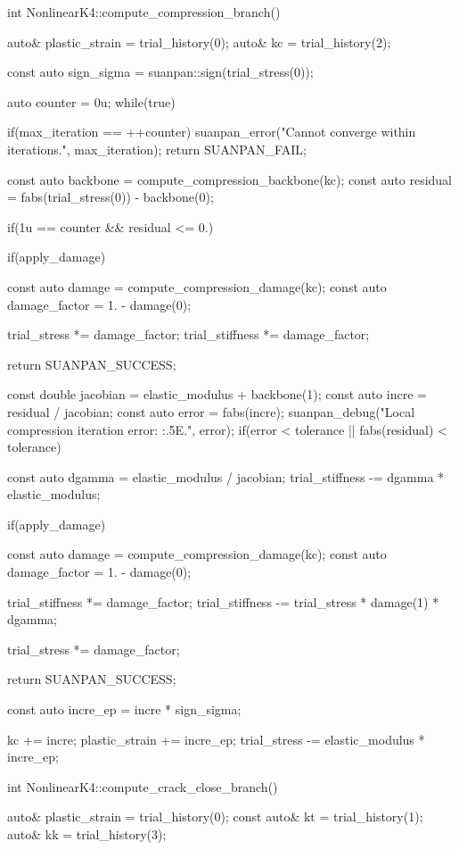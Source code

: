 \begin{cppcode}
int NonlinearK4::compute_compression_branch() {
    auto& plastic_strain = trial_history(0);
    auto& kc = trial_history(2);

    const auto sign_sigma = suanpan::sign(trial_stress(0));

    auto counter = 0u;
    while(true) {
        if(max_iteration == ++counter) {
            suanpan_error("Cannot converge within {} iterations.\n", max_iteration);
            return SUANPAN_FAIL;
        }

        const auto backbone = compute_compression_backbone(kc);
        const auto residual = fabs(trial_stress(0)) - backbone(0);

        if(1u == counter && residual <= 0.) {
            if(apply_damage) {
                const auto damage = compute_compression_damage(kc);
                const auto damage_factor = 1. - damage(0);

                trial_stress *= damage_factor;
                trial_stiffness *= damage_factor;
            }

            return SUANPAN_SUCCESS;
        }

        const double jacobian = elastic_modulus + backbone(1);
        const auto incre = residual / jacobian;
        const auto error = fabs(incre);
        suanpan_debug("Local compression iteration error: {:.5E}.\n", error);
        if(error < tolerance || fabs(residual) < tolerance) {
            const auto dgamma = elastic_modulus / jacobian;
            trial_stiffness -= dgamma * elastic_modulus;

            if(apply_damage) {
                const auto damage = compute_compression_damage(kc);
                const auto damage_factor = 1. - damage(0);

                trial_stiffness *= damage_factor;
                trial_stiffness -= trial_stress * damage(1) * dgamma;

                trial_stress *= damage_factor;
            }

            return SUANPAN_SUCCESS;
        }

        const auto incre_ep = incre * sign_sigma;

        kc += incre;
        plastic_strain += incre_ep;
        trial_stress -= elastic_modulus * incre_ep;
    }
}

int NonlinearK4::compute_crack_close_branch() {
    auto& plastic_strain = trial_history(0);
    const auto& kt = trial_history(1);
    auto& kk = trial_history(3);

}
\end{cppcode}
